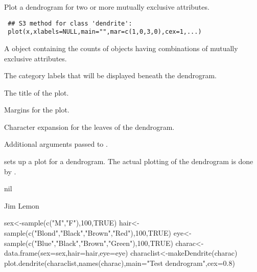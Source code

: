 \begin{Description}\relax
Plot a dendrogram for two or more mutually exclusive attributes.
\end{Description}
\begin{Usage}
\begin{verbatim}
 ## S3 method for class 'dendrite':
 plot(x,xlabels=NULL,main="",mar=c(1,0,3,0),cex=1,...)
\end{verbatim}
\end{Usage}
\begin{Arguments}
\begin{ldescription}
\item[\code{x}] A  object containing the counts of objects having
combinations of mutually exclusive attributes.
\item[\code{xlabels}] The category labels that will be displayed beneath the
dendrogram.
\item[\code{main}] The title of the plot.
\item[\code{mar}] Margins for the plot.
\item[\code{cex}] Character expansion for the leaves of the dendrogram.
\item[\code{...}] Additional arguments passed to .
\end{ldescription}
\end{Arguments}
\begin{Details}\relax
{} sets up a plot for a dendrogram. The actual plotting of
the dendrogram is done by .
\end{Details}
\begin{Value}
nil
\end{Value}
\begin{Author}\relax
Jim Lemon
\end{Author}
\begin{SeeAlso}\relax
{}
\end{SeeAlso}
\begin{Examples}
\begin{ExampleCode}
 sex<-sample(c("M","F"),100,TRUE)
 hair<-sample(c("Blond","Black","Brown","Red"),100,TRUE)
 eye<-sample(c("Blue","Black","Brown","Green"),100,TRUE)
 charac<-data.frame(sex=sex,hair=hair,eye=eye)
 characlist<-makeDendrite(charac)
 plot.dendrite(characlist,names(charac),main="Test dendrogram",cex=0.8)
\end{ExampleCode}
\end{Examples}

